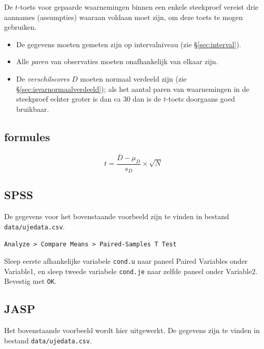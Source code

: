 \documentclass[
]{book}
\begin{document}
De \(t\)-toets voor gepaarde waarnemingen binnen een enkele steekproef vereist drie
aannames (assumpties) waaraan voldaan moet zijn, om deze toets te mogen
gebruiken.

\begin{itemize}
\item
  De gegevens moeten gemeten zijn op intervalniveau (zie
  §\ref{sec:interval}).
\item
  Alle \emph{paren} van observaties moeten onafhankelijk van elkaar
  zijn.
\item
  De \emph{verschilscores} \(D\) moeten normaal verdeeld zijn (zie
  §\ref{sec:isvarnormaalverdeeld}); als het aantal paren van
  waarnemingen in de steekproef echter groter is dan ca 30 dan is de \(t\)-toets
  doorgaans goed bruikbaar.
\end{itemize}

\hypertarget{sec:formules13-4}{%
\subsection{formules}\label{sec:formules13-4}}

\begin{equation}
  \label{eq:t-pairedsamples}
  t = \frac{ \overline{D}-\mu_D} { s_D } \times \sqrt{N}
\end{equation}

\hypertarget{sec:SPSS-ttoets-gepaard}{%
\subsection{SPSS}\label{sec:SPSS-ttoets-gepaard}}

De gegevens voor het bovenstaande voorbeeld zijn te vinden in bestand \texttt{data/ujedata.csv}.

\begin{verbatim}
Analyze > Compare Means > Paired-Samples T Test
\end{verbatim}

Sleep eerste afhankelijke variabele \texttt{cond.u} naar paneel Paired
Variables onder Variable1, en sleep tweede variabele \texttt{cond.je} naar
zelfde paneel onder Variable2. Bevestig met \texttt{OK}.

\hypertarget{sec:jaspttoetsgepaard}{%
\subsection{JASP}\label{sec:jaspttoetsgepaard}}

Het bovenstaande voorbeeld wordt hier uitgewerkt. De gegevens zijn te vinden in bestand \texttt{data/ujedata.csv}.
\end{document}
